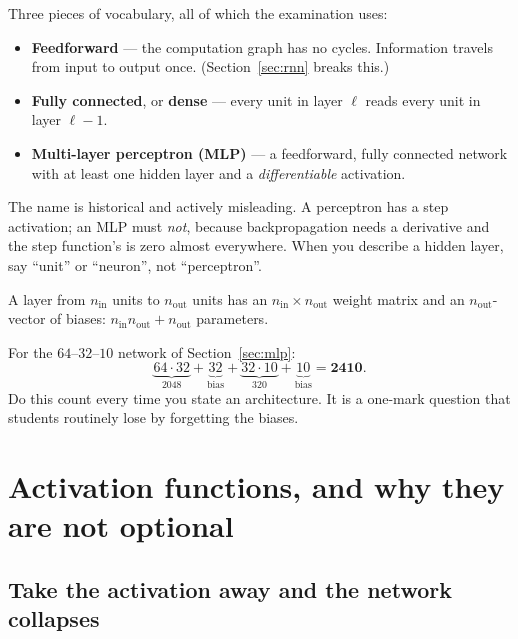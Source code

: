 \documentclass[11pt]{article}
\begin{document}
Three pieces of vocabulary, all of which the examination uses:

\begin{itemize}[leftmargin=*]
  \item \textbf{Feedforward} --- the computation graph has no cycles.
    Information travels from input to output once. (Section~\ref{sec:rnn}
    breaks this.)
  \item \textbf{Fully connected}, or \textbf{dense} --- every unit in layer
    $\ell$ reads every unit in layer $\ell - 1$.
  \item \textbf{Multi-layer perceptron (MLP)} --- a feedforward, fully
    connected network with at least one hidden layer and a
    \emph{differentiable} activation.
\end{itemize}

\begin{caution}
The name is historical and actively misleading. A perceptron has a step
activation; an MLP must \emph{not}, because backpropagation needs a
derivative and the step function's is zero almost everywhere. When you
describe a hidden layer, say ``unit'' or ``neuron'', not ``perceptron''.
\end{caution}

\begin{worked}
A layer from $n_{\text{in}}$ units to $n_{\text{out}}$ units has an
$n_{\text{in}} \times n_{\text{out}}$ weight matrix and an
$n_{\text{out}}$-vector of biases: $n_{\text{in}}n_{\text{out}} +
n_{\text{out}}$ parameters.

For the $64$--$32$--$10$ network of Section~\ref{sec:mlp}:
\[
  \underbrace{64 \cdot 32}_{2048} + \underbrace{32}_{\text{bias}}
  + \underbrace{32 \cdot 10}_{320} + \underbrace{10}_{\text{bias}}
  = \mathbf{2410}.
\]
Do this count every time you state an architecture. It is a one-mark question
that students routinely lose by forgetting the biases.
\end{worked}

\section{Activation functions, and why they are not optional}
\label{sec:act}

\subsection{Take the activation away and the network collapses}
\label{sec:collapse}
\end{document}
